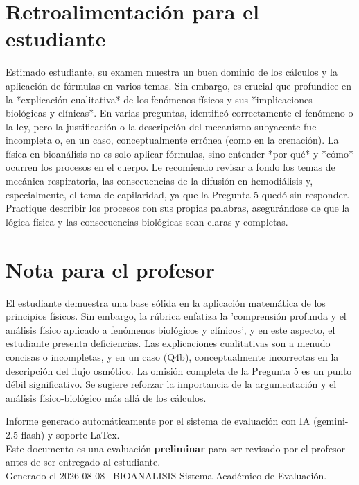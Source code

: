 \documentclass[11pt,a4paper]{article}
\begin{document}
\section*{Retroalimentación para el estudiante}
\begin{tcolorbox}[cajaRecomendacion, title={Dirigido a: Debora Echezuria}]
Estimado estudiante, su examen muestra un buen dominio de los cálculos y la aplicación de fórmulas en varios temas. Sin embargo, es crucial que profundice en la *explicación cualitativa* de los fenómenos físicos y sus *implicaciones biológicas y clínicas*. En varias preguntas, identificó correctamente el fenómeno o la ley, pero la justificación o la descripción del mecanismo subyacente fue incompleta o, en un caso, conceptualmente errónea (como en la crenación). La física en bioanálisis no es solo aplicar fórmulas, sino entender *por qué* y *cómo* ocurren los procesos en el cuerpo. Le recomiendo revisar a fondo los temas de mecánica respiratoria, las consecuencias de la difusión en hemodiálisis y, especialmente, el tema de capilaridad, ya que la Pregunta 5 quedó sin responder. Practique describir los procesos con sus propias palabras, asegurándose de que la lógica física y las consecuencias biológicas sean claras y completas.
\end{tcolorbox}

\section*{Nota para el profesor}
\begin{tcolorbox}[
  enhanced, breakable,
  colback=yellow!8, colframe=yellow!60!black,
  fonttitle=\bfseries, coltitle=black,
  title={Observaciones para revisión manual},
  top=4pt, bottom=4pt, left=8pt, right=8pt,
]
El estudiante demuestra una base sólida en la aplicación matemática de los principios físicos. Sin embargo, la rúbrica enfatiza la 'comprensión profunda y el análisis físico aplicado a fenómenos biológicos y clínicos', y en este aspecto, el estudiante presenta deficiencias. Las explicaciones cualitativas son a menudo concisas o incompletas, y en un caso (Q4b), conceptualmente incorrectas en la descripción del flujo osmótico. La omisión completa de la Pregunta 5 es un punto débil significativo. Se sugiere reforzar la importancia de la argumentación y el análisis físico-biológico más allá de los cálculos.
\end{tcolorbox}

\vspace{12pt}
\begin{center}
  \footnotesize\color{gray}
  Informe generado automáticamente por el sistema de evaluación con IA (gemini-2.5-flash) y soporte LaTex. \\
  Este documento es una evaluación \textbf{preliminar} para ser revisado por el profesor antes de ser entregado al 
  estudiante. \\
  Generado el 2026-08-08 \textbullet\ BIOANALISIS Sistema Académico de Evaluación.
  \end{center}
\end{document}
